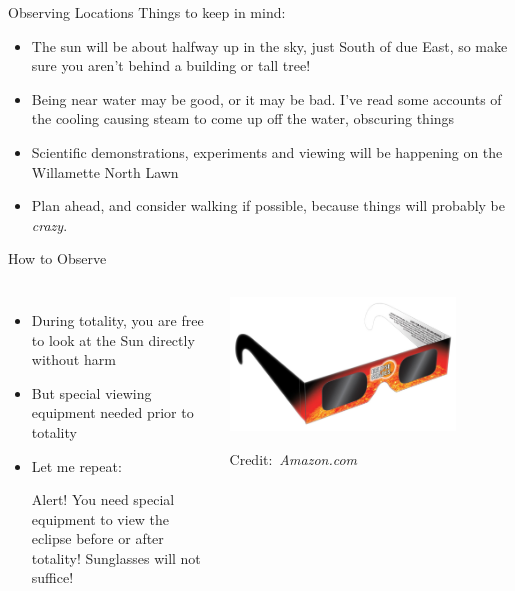 \documentclass[pdf, aspectratio=169]{beamer}
\newcommand{\credit}[1]{\par\hfill\tiny Credit:~\itshape#1\hspace*{.7cm}}
\begin{document}
\begin{frame}{Observing Locations}
	Things to keep in mind:
	\begin{itemize}
		\item The sun will be about halfway up in the sky, just South of due East, so make sure you aren't behind a building or tall tree!
		\item Being near water may be good, or it may be bad. I've read some accounts of the cooling causing steam to come up off the water, obscuring things
		\item Scientific demonstrations, experiments and viewing will be happening on the Willamette North Lawn
		\item Plan ahead, and consider walking if possible, because things will probably be \emph{crazy}.
	\end{itemize}
\end{frame}

\begin{frame}{How to Observe}
	\begin{columns}
		\begin{itemize}
			\item During totality, you are free to look at the Sun directly without harm
			\item But special viewing equipment needed prior to totality
			\item<2> Let me repeat:
				\begin{alertblock}{Alert!}
					You need special equipment to view the eclipse before or after totality! Sunglasses will not suffice!
				\end{alertblock}
		\end{itemize}	
		\begin{center}
			\includegraphics[width=0.8\textwidth]{shades.png}
			\credit{Amazon.com}
		\end{center}
	\end{columns}
\end{frame}
\end{document}
